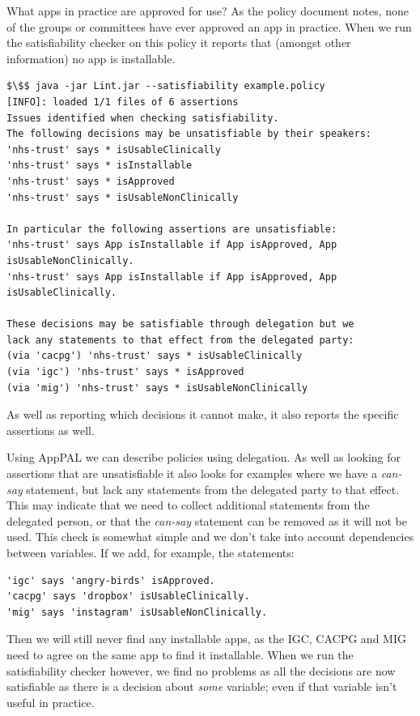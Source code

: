 \documentclass[thesis.tex]{subfiles}
\begin{document}
What apps in practice are approved for use?
As the policy document notes, none of the groups or committees have ever
approved an app in practice.
When we run the satisfiability checker on this policy
it reports that (amongst other information) no app is installable.

\begin{lstlisting}
$\$$ java -jar Lint.jar --satisfiability example.policy
[INFO]: loaded 1/1 files of 6 assertions
Issues identified when checking satisfiability.
The following decisions may be unsatisfiable by their speakers:
'nhs-trust' says * isUsableClinically
'nhs-trust' says * isInstallable
'nhs-trust' says * isApproved
'nhs-trust' says * isUsableNonClinically

In particular the following assertions are unsatisfiable:
'nhs-trust' says App isInstallable if App isApproved, App isUsableNonClinically.
'nhs-trust' says App isInstallable if App isApproved, App isUsableClinically.

These decisions may be satisfiable through delegation but we
lack any statements to that effect from the delegated party:
(via 'cacpg') 'nhs-trust' says * isUsableClinically
(via 'igc') 'nhs-trust' says * isApproved
(via 'mig') 'nhs-trust' says * isUsableNonClinically
\end{lstlisting}

As well as reporting which decisions it cannot make, it also reports the
specific assertions as well.

Using AppPAL we can describe policies using delegation. As well as looking for assertions that are unsatisfiable it also looks for examples where we have a \emph{can-say} statement, but lack any statements from the delegated party to that effect.  This may indicate that we need to collect additional statements from the delegated person, or that the \emph{can-say} statement can be removed as it will not be used.
This check is somewhat simple and we don't take into account dependencies
between variables.  If we add, for example, the statements:

\begin{lstlisting}
'igc' says 'angry-birds' isApproved.
'cacpg' says 'dropbox' isUsableClinically.
'mig' says 'instagram' isUsableNonClinically.
\end{lstlisting}

Then we will still never find any installable apps, as the \ac{IGC},
\ac{CACPG} and \ac{MIG} need to agree on the same app to find it
installable.  When we run the satisfiability checker however, we find
no problems as all the decisions are now satisfiable as there is a
decision about \emph{some} variable; even if that variable isn't
useful in practice.
\end{document}
